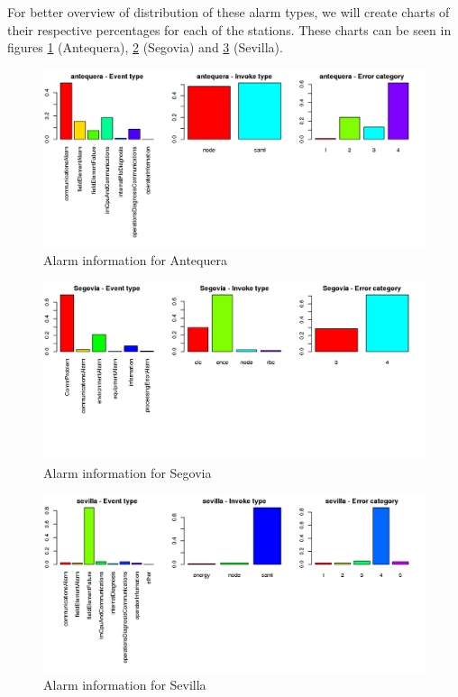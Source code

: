 \documentclass[a4paper,12pt]{article}
\begin{document}
For better overview of distribution of these alarm types, we will create charts of their respective percentages for each of the stations. These charts can be seen in figures \ref{fig:antequera_chart} (Antequera), \ref{fig:segovia_chart} (Segovia) and \ref{fig:sevilla_chart} (Sevilla).

\begin{figure}[htb]
 \centering
 \includegraphics[width=\textwidth]{./img/antequera_graph.png}
 \caption{Alarm information for Antequera}
 \label{fig:antequera_chart}
\end{figure}
\begin{figure}[htb]
 \centering
 \includegraphics[width=\textwidth]{./img/segovia_graph.png}
 \caption{Alarm information for Segovia}
 \label{fig:segovia_chart}
\end{figure}
\begin{figure}[htb]
 \centering
 \includegraphics[width=\textwidth]{./img/sevilla_graph.png}
 \caption{Alarm information for Sevilla}
 \label{fig:sevilla_chart}
\end{figure}
\end{document}
